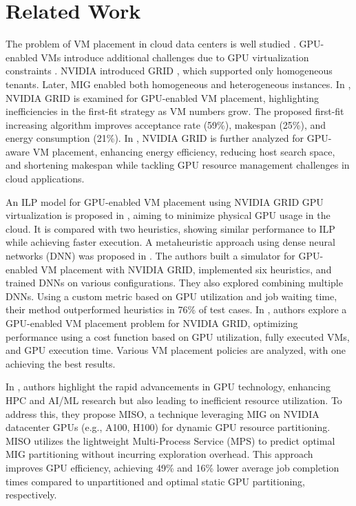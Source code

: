 \section{Related Work}
\label{s:related-work}
	
	The problem of VM placement in cloud data centers is well studied \cite{dias2021,imran2022,saidi2023task,lin2024energy,alahmad2024multiple,xu2024meta,regaieg2021multi}. GPU-enabled VMs introduce additional challenges due to GPU virtualization constraints \cite{hong2017gpu}. NVIDIA introduced GRID \cite{nvidia_grid_doc}, which supported only homogeneous tenants. Later, MIG \cite{nvidia_mig_doc} enabled both homogeneous and heterogeneous instances. In \cite{siavashi2019gpucloudsim}, NVIDIA GRID is examined for GPU-enabled VM placement, highlighting inefficiencies in the first-fit strategy as VM numbers grow. The proposed first-fit increasing algorithm improves acceptance rate (59\%), makespan (25\%), and energy consumption (21\%). In \cite{kulkarni2021gpu}, NVIDIA GRID is further analyzed for GPU-aware VM placement, enhancing energy efficiency, reducing host search space, and shortening makespan while tackling GPU resource management challenges in cloud applications.
	
	An ILP model for GPU-enabled VM placement using NVIDIA GRID GPU virtualization is proposed in \cite{garg2019virtual}, aiming to minimize physical GPU usage in the cloud. It is compared with two heuristics, showing similar performance to ILP while achieving faster execution. A metaheuristic approach using dense neural networks (DNN) was proposed in \cite{sivaraman2019tecn}. The authors built a simulator for GPU-enabled VM placement with NVIDIA GRID, implemented six heuristics, and trained DNNs on various configurations. They also explored combining multiple DNNs. Using a custom metric based on GPU utilization and job waiting time, their method outperformed heuristics in 76\% of test cases. In \cite{sivaraman2018task}, authors explore a GPU-enabled VM placement problem for NVIDIA GRID, optimizing performance using a cost function based on GPU utilization, fully executed VMs, and GPU execution time. Various VM placement policies are analyzed, with one achieving the best results. 
	
	In \cite{li2022miso}, authors highlight the rapid advancements in GPU technology, enhancing HPC and AI/ML research but also leading to inefficient resource utilization. To address this, they propose MISO, a technique leveraging MIG on NVIDIA datacenter GPUs (e.g., A100, H100) for dynamic GPU resource partitioning. MISO utilizes the lightweight Multi-Process Service (MPS) \cite{nvidia_mps_doc} to predict optimal MIG partitioning without incurring exploration overhead. This approach improves GPU efficiency, achieving 49\% and 16\% lower average job completion times compared to unpartitioned and optimal static GPU partitioning, respectively.
	
